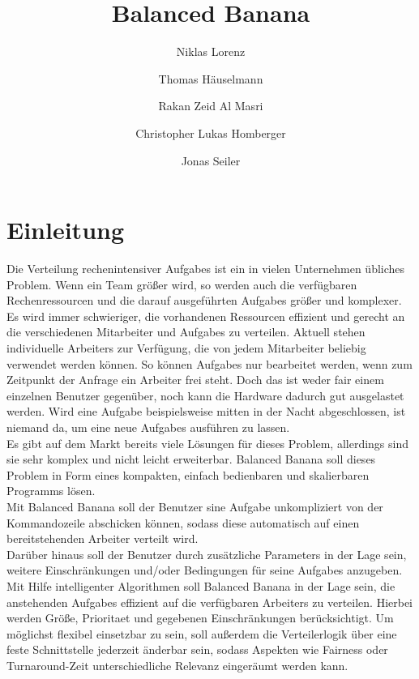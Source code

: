 \documentclass[a4paper,12pt]{article}
\title{Balanced Banana}
\author{Niklas Lorenz \and Thomas Häuselmann \and Rakan Zeid Al Masri \and Christopher Lukas Homberger \and Jonas Seiler}
\begin{document}
\setcounter{page}{2}
\tableofcontents          %
\clearpage
{}

\section{Einleitung}
\vspace*{1cm}

Die Verteilung rechenintensiver \glspl{Aufgabe} ist ein in vielen Unternehmen übliches Problem. Wenn ein Team größer wird, so werden auch die verfügbaren Rechenressourcen und die darauf ausgeführten \glspl{Aufgabe} größer und komplexer.\\


Es wird immer schwieriger, die vorhandenen Ressourcen effizient und gerecht an die verschiedenen Mitarbeiter und \glspl{Aufgabe} zu verteilen.
Aktuell stehen individuelle \glspl{Arbeiter} zur Verfügung, die von jedem Mitarbeiter beliebig verwendet werden können. So können \glspl{Aufgabe} nur bearbeitet werden, wenn zum Zeitpunkt der Anfrage ein \gls{Arbeiter} frei steht. Doch das ist weder fair einem einzelnen \gls{Benutzer} gegenüber, noch kann die Hardware dadurch gut ausgelastet werden. Wird eine \gls{Aufgabe} beispielsweise mitten in der Nacht abgeschlossen, ist niemand da, um eine neue \glspl{Aufgabe} ausführen zu lassen. \\


Es gibt auf dem Markt bereits viele Lösungen für dieses Problem, allerdings sind sie sehr komplex und nicht leicht erweiterbar.
Balanced Banana soll dieses Problem in Form eines kompakten, einfach bedienbaren und skalierbaren Programms lösen. \\

Mit Balanced Banana soll der \gls{Benutzer} sine \gls{Aufgabe} unkompliziert von der \gls{Kommandozeile} abschicken können, sodass diese automatisch auf einen bereitstehenden \gls{Arbeiter} verteilt wird. \\

Darüber hinaus soll der \gls{Benutzer} durch zusätzliche \glspl{Parameter} in der Lage sein, weitere Einschränkungen und/oder Bedingungen für seine \glspl{Aufgabe} anzugeben.\\

Mit Hilfe intelligenter Algorithmen soll Balanced Banana in der Lage sein, die anstehenden \glspl{Aufgabe} effizient auf die verfügbaren \glspl{Arbeiter} zu verteilen. Hierbei werden Größe, \gls{Prioritaet} und gegebenen Einschränkungen berücksichtigt. Um möglichst flexibel einsetzbar zu sein, soll außerdem die \gls{Verteilerlogik} über eine feste \gls{Schnittstelle} jederzeit änderbar sein, sodass Aspekten wie Fairness oder \gls{Turnaround}-Zeit unterschiedliche Relevanz eingeräumt werden kann.
\end{document}
